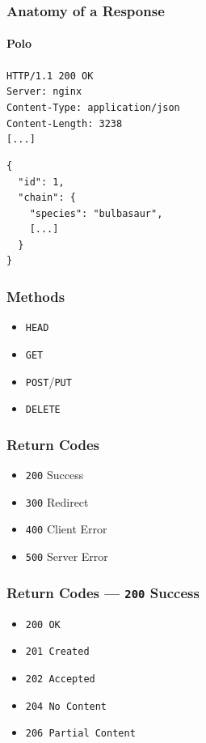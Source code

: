 \documentclass{beamer}
\begin{document}
\begin{frame}[fragile=singleslide]
  \frametitle{Anatomy of a Response}
  \framesubtitle{Polo}

  \texttt{{\color{blue}HTTP/1.1} \color{orange}200 OK} \\
  {
    \color{olive}
    \texttt{Server: nginx} \\
    \texttt{Content-Type: application/json} \\
    \texttt{Content-Length: 3238} \\
    \texttt{[...]} \\
  } \bigskip

  {
    \color{violet}
    \begin{verbatim}
{
  "id": 1,
  "chain": {
    "species": "bulbasaur",
    [...]
  }
}
    \end{verbatim}
  }
\end{frame}


\begin{frame}
  \frametitle{Methods}
  \begin{itemize}
    \item \texttt{HEAD}
    \item \texttt{GET}
    \item \texttt{POST}/\texttt{PUT}
    \item \texttt{DELETE}
  \end{itemize}
\end{frame}


\begin{frame}
  \frametitle{Return Codes}
  \begin{itemize}
    \item \texttt{200} Success 
    \item \texttt{300} Redirect
    \item \texttt{400} Client Error
    \item \texttt{500} Server Error
  \end{itemize}
\end{frame}


\begin{frame}
  \frametitle{Return Codes --- \texttt{200} Success}
  \begin{itemize}
    \item \texttt{200 OK}
    \item \texttt{201 Created}
    \item \texttt{202 Accepted}
    \item \texttt{204 No Content}
    \item \texttt{206 Partial Content}
  \end{itemize}
\end{frame}
\end{document}
